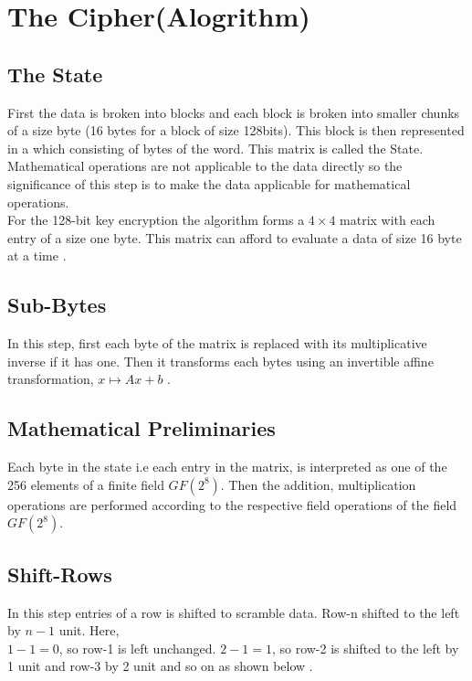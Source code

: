 \vspace{7mm}
\section{The Cipher(Alogrithm)}
\subsection{The State}
First the data is broken into blocks and each block is broken into smaller chunks of a size byte (16 bytes for a block of size 128bits). This block is then represented in a  which consisting of bytes of the word. This matrix is called the State.\\
Mathematical operations are not applicable to the data directly so the significance of this step is to make the data applicable for mathematical operations.\\
For the 128-bit key encryption the algorithm forms a \(4 \times 4\) matrix with each entry of a size one byte. This matrix can afford to evaluate a data of size 16 byte at a time \cite{aes}.

\vspace{3mm}
\subsection{Sub-Bytes}
In this step, first each byte of the matrix is replaced with its multiplicative inverse if it has one. Then it transforms each bytes using an invertible affine transformation, \(x \mapsto Ax+b\) \cite{aes}.

\subsection{Mathematical Preliminaries}
Each byte in the state i.e each entry in the matrix, is interpreted as one of the 256 elements of a finite field \(GF(2^8)\). Then the addition, multiplication operations are performed according to the respective field operations of the field \(GF(2^8)\).

\vspace{3mm}
\subsection{Shift-Rows}
In this step entries of a row is shifted to scramble data. Row-n shifted to the left by \(n-1\) unit. Here,\\
\(1-1=0\), so row-1 is left unchanged. \(2-1=1\), so row-2 is shifted to the left by 1 unit and row-3 by 2 unit and so on as shown below \cite{aes}.


